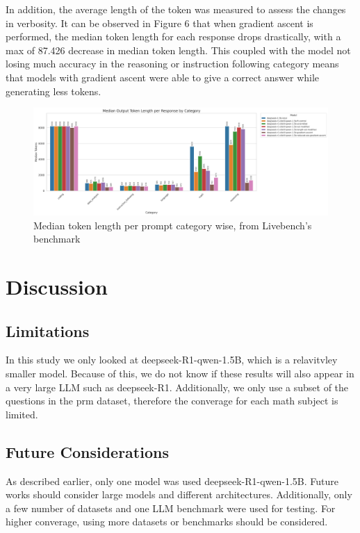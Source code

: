 \documentclass[10.5pt]{article}
\begin{document}
In addition, the average length of the token was measured to assess the changes in verbosity. It can be observed in Figure 6 that when gradient ascent is performed, the median token length for each response drops drastically, with a max of 87.426 decrease in median token length. This coupled with the model not losing much accuracy in the reasoning or instruction following category means that models with gradient ascent were able to give a correct answer while generating less tokens.
\begin{figure}[h]
    \centering
    \includegraphics[width=1\linewidth]{token_length_median_by_category.png}
    \caption{Median token length per prompt category wise, from Livebench's benchmark}
    \label{fig:enter-label}
\end{figure}


\section{Discussion}
\subsection{Limitations}
In this study we only looked at deepseek-R1-qwen-1.5B, which is a relavitvley smaller model. Because of this, we do not know if these results will also appear in a very large LLM such as deepseek-R1. Additionally, we only use a subset of the questions in the prm dataset\cite{lightman2023lets}, therefore the converage for each math subject is limited.
\subsection{Future Considerations}
As described earlier, only one model was used deepseek-R1-qwen-1.5B. Future works should consider large models and different architectures. Additionally, only a few number of datasets and one LLM benchmark were used for testing. For higher converage, using more datasets or benchmarks should be considered.
\end{document}

